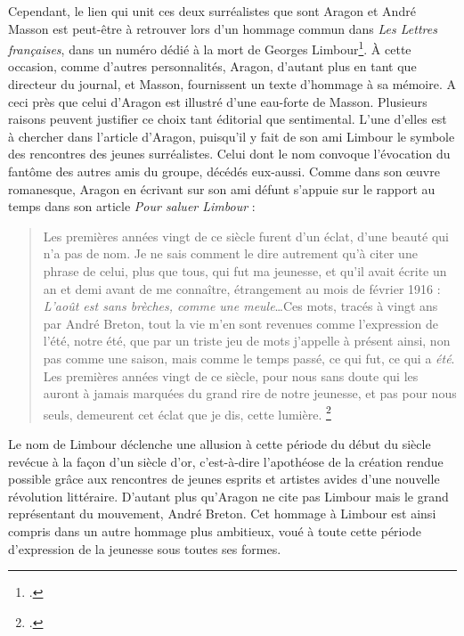 	Cependant, le lien qui unit ces deux surréalistes que sont Aragon et André Masson est peut-être à retrouver lors d’un hommage commun dans \emph{Les Lettres françaises}, dans un numéro dédié à la mort de Georges Limbour\footcite[]{journallimbour}. À cette occasion, comme d’autres personnalités, Aragon, d’autant plus en tant que directeur du journal, et Masson, fournissent un texte d’hommage à sa mémoire. A ceci près que celui d’Aragon est illustré d’une eau-forte de Masson. Plusieurs raisons peuvent justifier ce choix tant éditorial que sentimental. L’une d’elles est à chercher dans l’article d’Aragon, puisqu'il y fait de son ami Limbour le symbole des rencontres des jeunes surréalistes. Celui dont le nom convoque l’évocation du fantôme des autres amis du groupe, décédés eux-aussi. Comme dans son \oe{}uvre romanesque, Aragon en écrivant sur son ami défunt s’appuie sur le rapport au temps dans son article \emph{Pour saluer Limbour} : 


	\begin{quote}
	Les premières années vingt de ce siècle furent d’un éclat, d’une beauté qui n’a pas de nom. Je ne sais comment le dire autrement qu’à citer une phrase de celui, plus que tous, qui fut ma jeunesse, et qu’il avait écrite un an et demi avant de me connaître, étrangement au mois de février 1916 : \emph{L’août est sans brèches, comme une meule}…Ces mots, tracés à vingt ans par André Breton, tout la vie m’en sont revenues comme l’expression de l’été, notre été, que par un triste jeu de mots j’appelle à présent ainsi, non pas comme une saison, mais comme le temps passé, ce qui fut, ce qui a \emph{été}. Les premières années vingt de ce siècle, pour nous sans doute qui les auront à jamais marquées du grand rire de notre jeunesse, et pas pour nous seuls, demeurent cet éclat que je dis, cette lumière. 	
	\footcite[p3]{journallimbour}\end{quote}

	Le nom de Limbour déclenche une allusion à cette période du début du siècle revécue à la façon d’un siècle d’or, c’est-à-dire l’apothéose de la création rendue possible grâce aux rencontres de jeunes esprits et artistes avides d’une nouvelle révolution littéraire. D’autant plus qu’Aragon ne cite pas Limbour mais le grand représentant du mouvement, André Breton. Cet hommage à Limbour est ainsi compris dans un autre hommage plus ambitieux, voué à toute cette période d’expression de la jeunesse sous toutes ses formes. 

